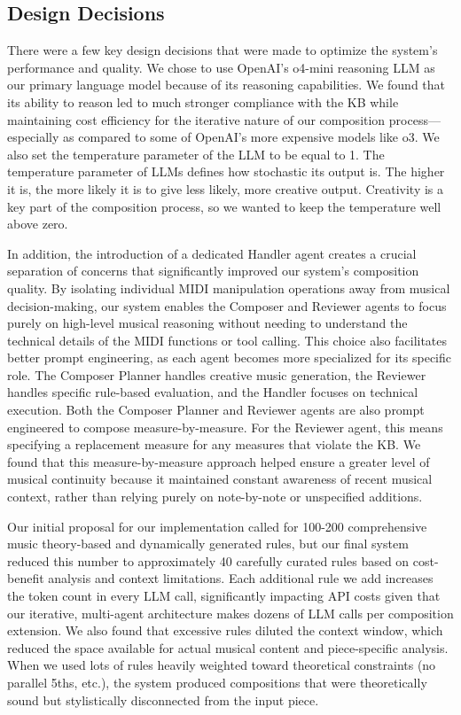 \documentclass[conference]{IEEEtran}
\begin{document}
\subsection{Design Decisions}

There were a few key design decisions that were made to optimize the system's performance and quality. We chose to use OpenAI's o4-mini reasoning LLM as our primary language model because of its reasoning capabilities. We found that its ability to reason led to much stronger compliance with the KB while maintaining cost efficiency for the iterative nature of our composition process—especially as compared to some of OpenAI's more expensive models like o3. We also set the temperature parameter of the LLM to be equal to 1. The temperature parameter of LLMs defines how stochastic its output is. The higher it is, the more likely it is to give less likely, more creative output. Creativity is a key part of the composition process, so we wanted to keep the temperature well above zero.  

In addition, the introduction of a dedicated Handler agent creates a crucial separation of concerns that significantly improved our system's composition quality. By isolating individual MIDI manipulation operations away from musical decision-making, our system enables the Composer and Reviewer agents to focus purely on high-level musical reasoning without needing to understand the technical details of the MIDI functions or tool calling. This choice also facilitates better prompt engineering, as each agent becomes more specialized for its specific role. The Composer Planner handles creative music generation, the Reviewer handles specific rule-based evaluation, and the Handler focuses on technical execution. Both the Composer Planner and Reviewer agents are also prompt engineered to compose measure-by-measure. For the Reviewer agent, this means specifying a replacement measure for any measures that violate the KB. We found that this measure-by-measure approach helped ensure a greater level of musical continuity because it maintained constant awareness of recent musical context, rather than relying purely on note-by-note or unspecified additions. 

Our initial proposal for our implementation called for 100-200 comprehensive music theory-based and dynamically generated rules, but our final system reduced this number to approximately 40 carefully curated rules based on cost-benefit analysis and context limitations. Each additional rule we add increases the token count in every LLM call, significantly impacting API costs given that our iterative, multi-agent architecture makes dozens of LLM calls per composition extension. We also found that excessive rules diluted the context window, which reduced the space available for actual musical content and piece-specific analysis. When we used lots of rules heavily weighted toward theoretical constraints (no parallel 5ths, etc.), the system produced compositions that were theoretically sound but stylistically disconnected from the input piece. 
\end{document}
